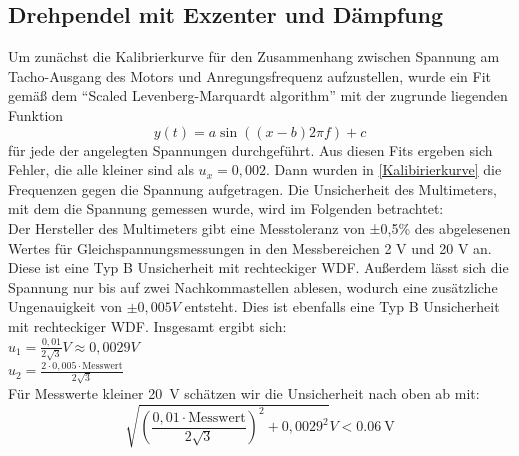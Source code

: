 \documentclass[
	a4paper,
	12pt,
	pagesize,
	ngerman
]{scrartcl}
\begin{document}
	\subsection{Drehpendel mit Exzenter und Dämpfung}
	
	Um zunächst die Kalibrierkurve für den Zusammenhang zwischen Spannung am Tacho-Ausgang des Motors und Anregungsfrequenz aufzustellen, wurde ein Fit gemäß dem \enquote{Scaled Levenberg-Marquardt algorithm} mit der zugrunde liegenden Funktion
	\begin{equation}
	y(t) = a \sin ((x-b)2 \pi f) + c
	\end{equation}
	für jede der angelegten Spannungen durchgeführt. Aus diesen Fits ergeben sich Fehler, die alle kleiner sind als $ u_x = 0,002 $. Dann wurden in \cref{Kalibirierkurve} die Frequenzen gegen die Spannung aufgetragen. Die Unsicherheit des Multimeters, mit dem die Spannung gemessen wurde, wird im Folgenden betrachtet: \\
	Der Hersteller des Multimeters gibt eine Messtoleranz von ±0,5\% des abgelesenen Wertes für Gleichspannungsmessungen in den Messbereichen 2 V und 20 V an. Diese ist eine Typ B Unsicherheit mit rechteckiger WDF. Außerdem lässt sich die Spannung nur bis auf zwei Nachkommastellen ablesen, wodurch eine zusätzliche Ungenauigkeit von $\pm 0,005\si{V}$ entsteht. Dies ist ebenfalls eine Typ B Unsicherheit mit rechteckiger WDF. Insgesamt ergibt sich: \\
	$u_1= \frac{0,01}{2\sqrt{3}} \si{V} \approx 0,0029 \si{V}$ \\
	$u_2= \frac{2 \cdot 0,005 \cdot \text{Messwert}}{2 \sqrt{3}}$ \\ %
	Für Messwerte kleiner \SI{20}{\volt} schätzen wir die Unsicherheit nach oben ab mit:
	\begin{equation*}
		\sqrt{(\frac{0,01 \cdot \text{Messwert}}{2 \sqrt{3}})^2 + 0,0029^2} \si{V} <  \SI{0,06}{\volt}
	\end{equation*}
	
\end{document}
